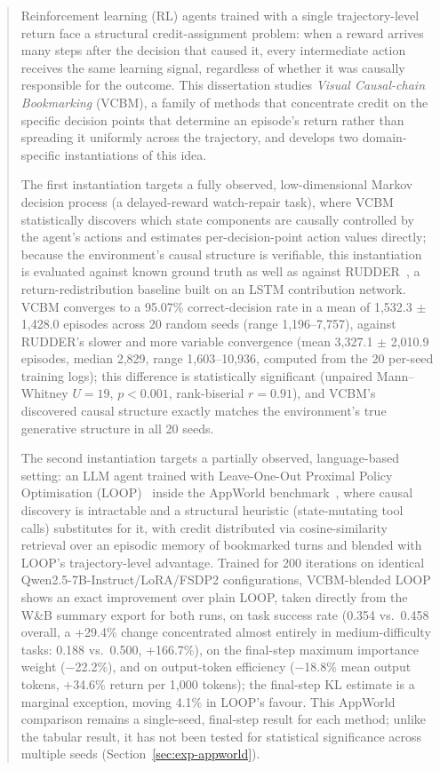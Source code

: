 \begin{abstract} %

  Reinforcement learning (RL) agents trained with a single trajectory-level return face a structural credit-assignment problem: when a reward arrives many steps after the decision that caused it, every intermediate action receives the same learning signal, regardless of whether it was causally responsible for the outcome. This dissertation studies \emph{Visual Causal-chain Bookmarking} (VCBM), a family of methods that concentrate credit on the specific decision points that determine an episode's return rather than spreading it uniformly across the trajectory, and develops two domain-specific instantiations of this idea.

  The first instantiation targets a fully observed, low-dimensional Markov decision process (a delayed-reward watch-repair task), where VCBM statistically discovers which state components are causally controlled by the agent's actions and estimates per-decision-point action values directly; because the environment's causal structure is verifiable, this instantiation is evaluated against known ground truth as well as against RUDDER~\cite{arjonaibarra2019rudder}, a return-redistribution baseline built on an LSTM contribution network. VCBM converges to a 95.07\% correct-decision rate in a mean of 1{,}532.3 $\pm$ 1{,}428.0 episodes across 20 random seeds (range 1{,}196--7{,}757), against RUDDER's slower and more variable convergence (mean 3{,}327.1 $\pm$ 2{,}010.9 episodes, median 2{,}829, range 1{,}603--10{,}936, computed from the 20 per-seed training logs); this difference is statistically significant (unpaired Mann--Whitney $U=19$, $p<0.001$, rank-biserial $r=0.91$), and VCBM's discovered causal structure exactly matches the environment's true generative structure in all 20 seeds.

  The second instantiation targets a partially observed, language-based setting: an LLM agent trained with Leave-One-Out Proximal Policy Optimisation (LOOP)~\cite{chen2025loop} inside the AppWorld benchmark~\cite{trivedi2024appworld}, where causal discovery is intractable and a structural heuristic (state-mutating tool calls) substitutes for it, with credit distributed via cosine-similarity retrieval over an episodic memory of bookmarked turns and blended with LOOP's trajectory-level advantage. Trained for 200 iterations on identical Qwen2.5-7B-Instruct/LoRA/FSDP2 configurations, VCBM-blended LOOP shows an exact improvement over plain LOOP, taken directly from the W\&B summary export for both runs, on task success rate (0.354 vs.\ 0.458 overall, a +29.4\% change concentrated almost entirely in medium-difficulty tasks: 0.188 vs.\ 0.500, +166.7\%), on the final-step maximum importance weight ($-$22.2\%), and on output-token efficiency ($-$18.8\% mean output tokens, +34.6\% return per 1{,}000 tokens); the final-step KL estimate is a marginal exception, moving 4.1\% in LOOP's favour. This AppWorld comparison remains a single-seed, final-step result for each method; unlike the tabular result, it has not been tested for statistical significance across multiple seeds (Section~\ref{sec:exp-appworld}).


\end{abstract}
